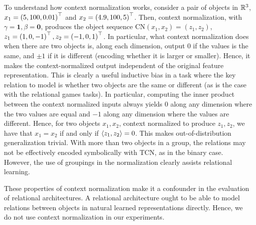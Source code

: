 To understand how context normalization works, consider a pair of objects in $\mathbb{R}^3$, $x_1 = \left(5, 100, 0.01\right)^\top$ and $x_2 = \left(4.9, 100, 5\right)^\top$. Then, context normalization, with $\gamma = \bm{1}, \beta = \bm{0}$, produces the object sequence $\mathrm{CN}(x_1, x_2) = (z_1, z_2)$, $z_1 = \left(1, 0, -1\right)^\top, z_2 = \left(-1, 0, 1\right)^\top$. In particular, what context normalization does when there are two objects is, along each dimension, output 0 if the values is the same, and $\pm 1$ if it is different (encoding whether it is larger or smaller). Hence, it makes the context-normalized output independent of the original feature representation. This is clearly a useful inductive bias in a task where the key relation to model is whether two objects are the same or different (as is the case with the relational games tasks). In particular, computing the inner product between the context normalized inputs always yields $0$ along any dimension where the two values are equal and $-1$ along any dimension where the values are different. Hence, for two objects $x_1, x_2$, context normalized to produce $z_1, z_2$, we have that $x_1 = x_2$ if and only if $\left \langle z_1, z_2 \right\rangle = 0$. This makes out-of-distribution generalization trivial. With more than two objects in a group, 
the relations may not be effectively encoded symbolically with TCN, as in the binary case. However, the use of groupings in the normalization clearly assists relational learning.

These properties of context normalization make it a confounder in the evaluation of relational architectures. A relational architecture ought to be able to model relations between objects in natural learned representations directly. Hence, we do not use context normalization in our experiments.